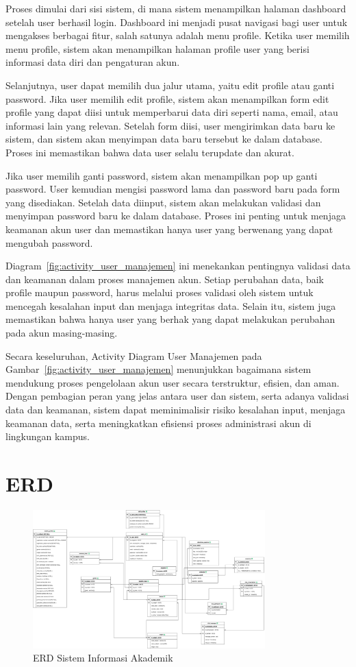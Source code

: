 \documentclass[a4paper,oneside,11pt]{book}
\begin{document}
Proses dimulai dari sisi sistem, di mana sistem menampilkan halaman dashboard setelah user berhasil login. Dashboard ini menjadi pusat navigasi bagi user untuk mengakses berbagai fitur, salah satunya adalah menu profile. Ketika user memilih menu profile, sistem akan menampilkan halaman profile user yang berisi informasi data diri dan pengaturan akun.

Selanjutnya, user dapat memilih dua jalur utama, yaitu edit profile atau ganti password. Jika user memilih edit profile, sistem akan menampilkan form edit profile yang dapat diisi untuk memperbarui data diri seperti nama, email, atau informasi lain yang relevan. Setelah form diisi, user mengirimkan data baru ke sistem, dan sistem akan menyimpan data baru tersebut ke dalam database. Proses ini memastikan bahwa data user selalu terupdate dan akurat.

Jika user memilih ganti password, sistem akan menampilkan pop up ganti password. User kemudian mengisi password lama dan password baru pada form yang disediakan. Setelah data diinput, sistem akan melakukan validasi dan menyimpan password baru ke dalam database. Proses ini penting untuk menjaga keamanan akun user dan memastikan hanya user yang berwenang yang dapat mengubah password.

Diagram~\ref{fig:activity_user_manajemen} ini menekankan pentingnya validasi data dan keamanan dalam proses manajemen akun. Setiap perubahan data, baik profile maupun password, harus melalui proses validasi oleh sistem untuk mencegah kesalahan input dan menjaga integritas data. Selain itu, sistem juga memastikan bahwa hanya user yang berhak yang dapat melakukan perubahan pada akun masing-masing.

Secara keseluruhan, Activity Diagram User Manajemen pada Gambar~\ref{fig:activity_user_manajemen} menunjukkan bagaimana sistem mendukung proses pengelolaan akun user secara terstruktur, efisien, dan aman. Dengan pembagian peran yang jelas antara user dan sistem, serta adanya validasi data dan keamanan, sistem dapat meminimalisir risiko kesalahan input, menjaga keamanan data, serta meningkatkan efisiensi proses administrasi akun di lingkungan kampus.

\section{ERD}
\begin{figure}[H]
  \centering
  \includegraphics[width=0.8\textwidth]{ERD/SIAKampus-ERD.jpg}
  \caption{ERD Sistem Informasi Akademik}
  \label{fig:erd_sistem_informasi_akademik}
\end{figure}
\end{document}
